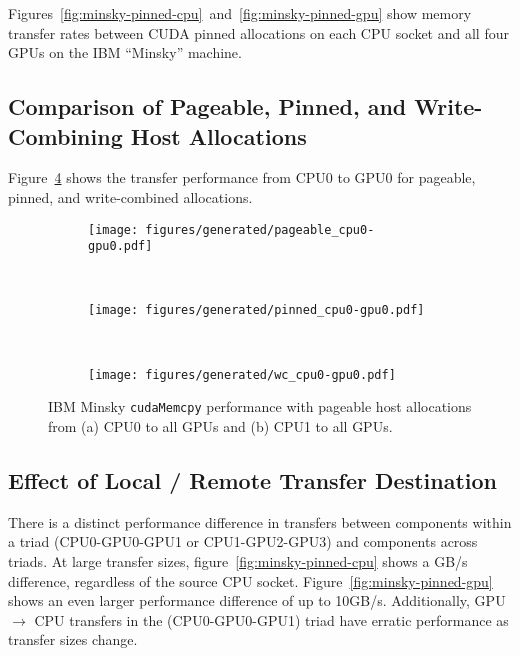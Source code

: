 Figures~\ref{fig:minsky-pinned-cpu}~and~\ref{fig:minsky-pinned-gpu} show memory transfer rates between CUDA pinned allocations on each CPU socket and all four GPUs on the IBM ``Minsky'' machine.

\subsection{Comparison of Pageable, Pinned, and Write-Combining Host Allocations}

Figure~\ref{fig:pageable-pinned-wc} shows the transfer performance from CPU0 to GPU0 for pageable, pinned, and write-combined allocations.

\begin{figure}[ht]
    \centering
    \begin{subfigure}[b]{0.3\textwidth}
        \texttt{[image: figures/generated/pageable\_cpu0-gpu0.pdf]}
        \caption{}
        \label{fig:}
    \end{subfigure}
    ~
    \begin{subfigure}[b]{0.3\textwidth}
        \texttt{[image: figures/generated/pinned\_cpu0-gpu0.pdf]}
        \caption{}
        \label{fig:}
    \end{subfigure}
    ~
    \begin{subfigure}[b]{0.3\textwidth}
        \texttt{[image: figures/generated/wc\_cpu0-gpu0.pdf]}
        \caption{}
        \label{fig:}
    \end{subfigure}
    \caption[]{
        IBM Minsky \texttt{cudaMemcpy} performance with pageable host allocations from (a) CPU0 to all GPUs and (b) CPU1 to all GPUs.
    }
    \label{fig:pageable-pinned-wc}
\end{figure}

\subsection{Effect of Local / Remote Transfer Destination}

There is a distinct performance difference in transfers between components within a triad (CPU0-GPU0-GPU1 or CPU1-GPU2-GPU3) and components across triads.
At large transfer sizes, figure~\ref{fig:minsky-pinned-cpu} shows a  GB/s difference, regardless of the source CPU socket.
Figure~\ref{fig:minsky-pinned-gpu} shows an even larger performance difference of up to 10GB/s.
Additionally, GPU $\rightarrow$ CPU transfers in the (CPU0-GPU0-GPU1) triad have erratic performance as transfer sizes change.

